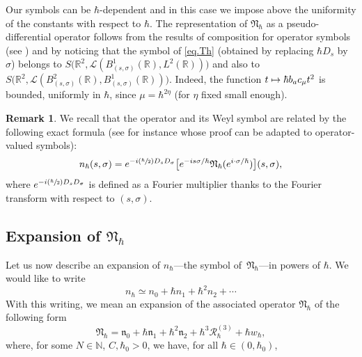 \documentclass[JEP,XML,SOM,Unicode,NoFloatCountersInSection,published]{cedram}
\newcommand\mto{\mathchoice{\longmapsto}{\mapsto}{\mapsto}{\mapsto}}
\newcommand{\Psfrac}[2]{(\sfrac{#1}{#2})}
\theoremstyle{plain}
\theoremstyle{definition}
\newtheorem{remark}[theorem]{Remark}
\newcommand{\R}{\mathbb{R}}
\begin{document}
Our symbols can be $\hbar$-dependent and in this case we impose above the uniformity of the constants with respect to $\hbar$.\/
The representation of $\mathfrak{N}_{\hbar}$ as a pseudo-differential operator follows from the results of composition for operator symbols (see \cite[Th.\,2.1.12]{Keraval}) and by noticing that the symbol of \eqref{eq.Th} (obtained by replacing $\hbar D_s$ by $\sigma$) belongs to $S\bigl(\R^2,\mathscr{L}(B_{(s,\sigma)}^1(\R),L^2(\R))\bigr)$ and also to $S\bigl(\R^2,\mathscr{L}(B_{(s,\sigma)}^2(\R),B_{(s,\sigma)}^1(\R))\bigr)$. Indeed, the function $t\mto\hbar b_a c_\mu t^2$ is bounded, uniformly in $\hbar$, since $\mu=\hbar^{2\eta}$ (for $\eta$ fixed small enough).

\begin{remark}
We recall that the operator and its Weyl symbol are related by the following exact formula (see for instance \cite[Th.\, 4.19 \& 4.13]{Zworski} whose proof can be adapted to operator-valued symbols):
\[
n_{\hbar}(s,\sigma)=e^{-i\Psfrac\hbar2 D_s D_\sigma} \bigl[e^{-is\sigma/\hbar}\mathfrak{N}_{\hbar} (e^{i\cdot\sigma/\hbar}) \bigr](s,\sigma),
\]
where $e^{-i\Psfrac\hbar2 D_s D_\sigma}$ is defined as a Fourier multiplier thanks to the Fourier transform with respect to $(s,\sigma)$.
\end{remark}

\subsection{Expansion of $\mathfrak{N}_{\hbar}$}
Let us now describe an expansion of $n_{\hbar}$---the symbol of~$\mathfrak{N}_{\hbar}$---in powers of $\hbar$. We would like to write
\begin{equation}\label{eq:exp-symb-Nhc}
n_{\hbar}\simeq n_0+\hbar n_1+\hbar^2n_2+\cdots
\end{equation}
With this writing, we mean an expansion of the associated operator $\mathfrak N_{\hbar}$ of the following form
\begin{equation}\label{eq:ex-Nhc}
\mathfrak{N}_{\hbar}=\mathfrak n_0+\hbar\mathfrak n_1+\hbar^2\mathfrak n_2+\mathcal \hbar^3\mathscr R_\hbar^{(3)}+\hbar w_\hbar,
\end{equation}
where, for some $N\in\mathbb {N}$, $C, \hbar_0>0$, we have, for all $\hbar\in(0,\hbar_0)$,
\end{document}
